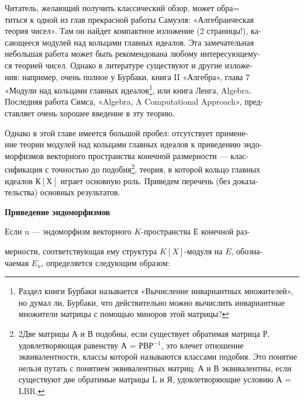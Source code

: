 Читатель, желающий получить классический обзор, может 
обра=\\титься к одной из глав прекрасной работы Самуэля: «Алгебраическая\\ 
теория чисел». Там он найдет компактное изложение (2 страницы!), 
ка-\\сающееся модулей над кольцами главных идеалов. Эта замечательная\\
небольшая работа может быть рекомендована любому 
интересующему-\\ся теорией чисел. Однако в литературе существуют и другие
изложе-\\ния: например, очень полное у Бурбаки, книга II «Алгебра», глава 7\\ 
«Модули над кольцами главных идеалов\footnote{Раздел книги Бурбаки называется «Вычисление инвариантных множителей», но 
думал ли, Бурбаки, что действительно можно вычислить инвариантные множители матрицы с помощью миноров этой матрицы? }, или книга Ленга, Algebra.\\ 
Последняя работа Симса, «Algebra, A Computational Approach», 
пред-\\ставляет очень хорошее введение в эту теорию. 


Однако в этой главе имеется большой пробел: отсутствует 
примене-\\ние теории модулей над кольцами главных идеалов к приведению 
эндо-\\морфизмов векторного пространства конечной размерности — 
клас-\\сификация с точностью до подобия\footnote{2Две матрицы А и В подобны, если существует обратимая матрица Р, 
удовлетворяющая равенству А = РВР$^{-1}$, это влечет отношение эквивалентности, классы 
которой называются классами подобия. Это понятие нельзя путать с понятием 
эквивалентных матриц: А и В эквивалентны, если существуют две обратимые матрицы 
L и Я, удовлетворяющие условию А = LBR.}, теория, в которой кольцо главных\\ идеалов $К[Х]$ играет основную роль. Приведем перечень (без 
доказа-\\тельства) основных результатов.

\medskip

{\noindent \bf Приведение эндоморфизмов} 

\medskip
Если u — эндоморфизм векторного $K$-пространства $Е$ конечной раз-


\pagebreak

\noindent мерности, соответствующая ему структура $K[X]$-модуля на $E$, 
обозна-\\чаемая $E_u$, определяется следующим образом: 

